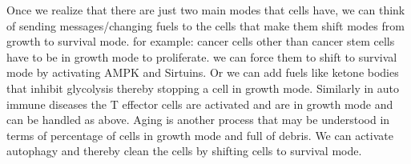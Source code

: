 Once we realize that there are just two main modes that cells have, we can think of sending messages/changing fuels to the cells that make them shift modes from growth to survival mode.
for example: cancer cells other than cancer stem cells have to be in growth mode to proliferate. we can force them to shift to survival mode by activating AMPK and Sirtuins. Or we can add fuels like ketone bodies that inhibit glycolysis thereby stopping a cell in growth mode.
Similarly in auto immune diseases the T effector cells are activated and are in growth mode and can be handled as above.
Aging is another process that may be understood in terms of percentage of cells in growth mode and full of debris. We can activate autophagy and thereby clean the cells by shifting cells to survival mode.
